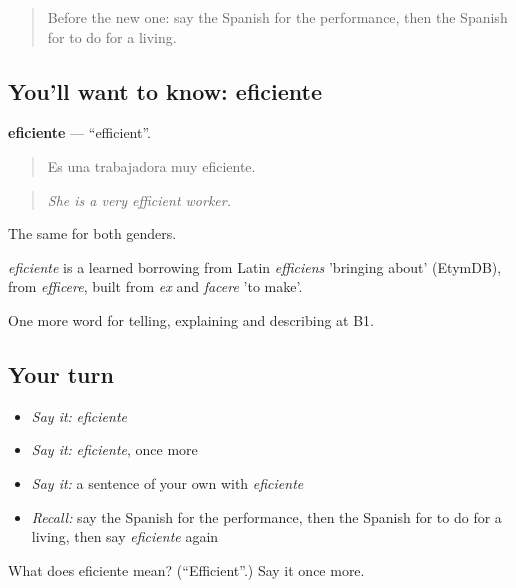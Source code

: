 \label{lesson:ES-C593-eficiente}



\begin{quote}
Before the new one: say the Spanish for the performance, then the Spanish for to do for a living.
\end{quote}

\subsection*{You'll want to know: eficiente}
\textbf{eficiente} — \textquotedblleft{}efficient\textquotedblright{}.

\begin{quote}
Es una trabajadora muy eficiente.
\end{quote}

\begin{quote}
\emph{She is a very efficient worker.}
\end{quote}

The same for both genders.

\begin{cousinweb}
\emph{eficiente} is a learned borrowing from Latin \emph{efficiens} 'bringing about' (EtymDB), from \emph{efficere}, built from \emph{ex} and \emph{facere} 'to make'.
\end{cousinweb}

\begin{grammarlens}[title={What you've built}]
One more word for telling, explaining and describing at B1.
\end{grammarlens}

\subsection*{Your turn}
\begin{itemize}
\raggedright
  \item \emph{Say it:} \emph{eficiente}
  \item \emph{Say it:} \emph{eficiente}, once more
  \item \emph{Say it:} a sentence of your own with \emph{eficiente}
  \item \emph{Recall:} say the Spanish for the performance, then the Spanish for to do for a living, then say \emph{eficiente} again
\end{itemize}

\begin{tcolorbox}[breakable,colback=teal!4,colframe=teal!35!black,title={Before you move on}]
What does eficiente mean? (\textquotedblleft{}Efficient\textquotedblright{}.) Say it once more.
\end{tcolorbox}
